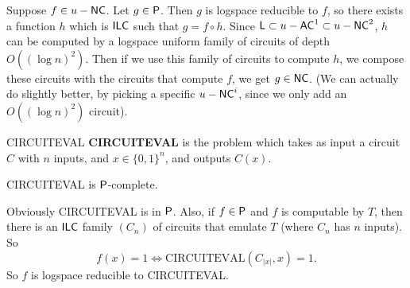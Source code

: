 \documentclass{article}
\begin{document}
\proof Suppose $f \in u-\mathsf{NC}$. Let $g \in \mathsf{P}$. Then $g$ is logspace reducible to $f$, so there exists a function $h$ which is $\mathsf{ILC}$ such that $g = f \circ h$. Since $\mathsf{L} \subset u-\mathsf{AC}^{1} \subset u-\mathsf{NC}^{2}$, $h$ can be computed by a logspace uniform family of circuits of depth $O((\log n)^{2})$. Then if we use this family of circuits to compute $h$, we compose these circuits with the circuits that compute $f$, we get $g \in \mathsf{NC}$. (We can actually do slightly better, by picking a specific $u-\mathsf{NC}^{i}$, since we only add an $O((\log n)^{2})$ circuit). \endproof
\begin{fancydefine}{CIRCUITEVAL}
    \textbf{CIRCUITEVAL} is the problem which takes as input a circuit $C$ with $n$ inputs, and $x \in \{0,1\}^{n}$, and outputs $C(x)$.
\end{fancydefine}
\begin{fancyprop}{}
    CIRCUITEVAL is $\mathsf{P}$-complete.
\end{fancyprop}
\proof Obviously CIRCUITEVAL is in $\mathsf{P}$. Also, if $f \in \mathsf{P}$ and $f$ is computable by $T$, then there is an $\mathsf{ILC}$ family $(C_{n})$ of circuits that emulate $T$ (where $C_{n}$ has $n$ inputs). So \[ f(x)=1 \Leftrightarrow \text{CIRCUITEVAL}(C_{|x|},x)=1.\]
So $f$ is logspace reducible to CIRCUITEVAL. \endproof
\end{document}
